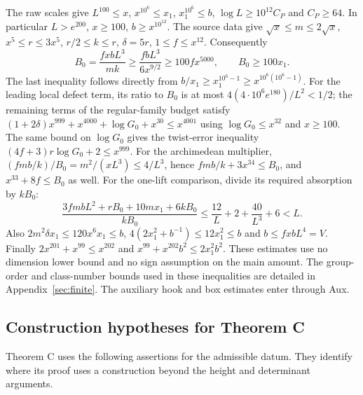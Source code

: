The raw scales give
$L^{100}\le x$, $x^{10^6}\le x_1$, $x_1^{10^6}\le b$,
$\log L\ge10^{12}C_P$ and
$C_P\ge64$. In particular $L>e^{200}$,
$x\ge100$, $b\ge x^{10^{12}}$. The source data give
$\sqrt{x}\le m\le2\sqrt{x}$, $x^5\le r\le3x^5$,
$r/2\le k\le r$, $\delta=5r$, $1\le f\le x^{12}$.
Consequently
\[
 B_0=\frac{f x b L^3}{mk}\ge\frac{f bL^3}{6x^{9/2}}
 \ge100f x^{5000},\qquad
 B_0\ge100x_1.
\]
The last inequality follows directly from
$b/x_1\ge x_1^{10^6-1}\ge x^{10^6(10^6-1)}$.
For the leading local defect term, its ratio to $B_0$ is at most
$4(4\cdot10^6e^{180})/L^2<1/2$; the remaining terms of
the regular-family budget satisfy
$(1+2\delta)x^{999}+x^{4000}+\log G_0+x^{30}\le x^{4001}$
using $\log G_0\le x^{32}$ and $x\ge100$.
The same bound on $\log G_0$ gives the twist-error inequality
$(4f+3)r\log G_0+2\le x^{999}$.
For the archimedean multiplier,
$(fmb/k)/B_0=m^2/(xL^3)\le4/L^3$,
hence $fmb/k+3x^{34}\le B_0$, and
$x^{33}+8f\le B_0$ as well. For the one-lift comparison,
divide its required absorption by $kB_0$:
\[
 \frac{3fmbL^2+rB_0+10mx_1+6kB_0}{kB_0}
 \le\frac{12}{L}+2+\frac{40}{L^3}+6<L .
\]
Also $2m^2\delta x_1\le120x^6x_1\le b$,
$4(2x_1^2+b^{-1})\le12x_1^2\le b$ and
$b\le fxbL^4=V$. Finally
$2x^{201}+x^{99}\le x^{202}$ and
$x^{99}+x^{202}b^2\le2x_1^2b^2$.
These estimates use no dimension lower bound and no sign assumption
on the main amount. The group-order and class-number bounds used in these
inequalities are detailed in Appendix~\ref{sec:finite}.
The auxiliary hook and box estimates enter through Aux.

\subsection{Construction hypotheses for Theorem C}\label{c3:frontier}

Theorem C uses the following assertions for the admissible datum.
They identify where its proof uses a construction beyond the
height and determinant arguments.

